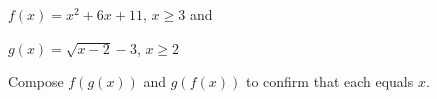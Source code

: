 {$f(x) = x^2+6x+11$, $x\geq 3$ and 

$g(x) = \sqrt{x-2}-3$, $x\geq 2$}
{Compose $f(g(x))$ and $g(f(x))$ to confirm that each equals $x$.
}
